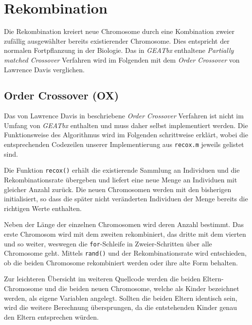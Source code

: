 \section{Rekombination}\label{recombination}

Die Rekombination kreiert neue Chromosome durch eine Kombination zweier zufällig
ausgewählter bereits existierender Chromosome. Dies entspricht der normalen
Fortpflanzung in der Biologie.
Das in \emph{GEATbx} enthaltene \emph{Partially matched Crossover} Verfahren
wird im Folgenden mit dem \emph{Order Crossover} von Lawrence Davis verglichen.


\subsection{Order Crossover (OX)}
Das von Lawrence Davis in \citep{ox} beschriebene \emph{Order Crossover} Verfahren ist nicht im
Umfang von \emph{GEATbx} enthalten und muss daher selbst implementiert werden.
Die Funktionsweise des Algorithmus wird im Folgenden schrittweise erklärt, wobei
die entsprechenden Codezeilen unserer Implementierung aus {\tt recox.m}
jeweils gelistet sind.

\newcommand{\recox}[2]{}

Die Funktion {\tt recox()} erhält die existierende Sammlung an Individuen und
die Rekombinationsrate übergeben und liefert eine neue Menge an Individuen mit
gleicher Anzahl zurück.
Die neuen Chromosomen werden mit den bisherigen initialisiert, so dass die
später nicht veränderten Individuen der Menge bereits die richtigen Werte
enthalten.

\recox{1}{5}

\noindent Neben der Länge der einzelnen Chromosomen wird deren Anzahl bestimmt.
Das erste Chromosom wird mit dem zweiten rekombiniert, das dritte mit dem vierten
und so weiter, weswegen die {\tt for}-Schleife in Zweier-Schritten über alle
Chromosome geht.
Mittels {\tt rand()} und der Rekombinationsrate wird entschieden, ob die beiden
Chromosome rekombiniert werden oder ihre alte Form behalten.

\recox{7}{13}

\noindent Zur leichteren Übersicht im weiteren Quellcode werden die beiden
Eltern-Chromosome und die beiden neuen Chromosome, welche als Kinder bezeichnet
werden, als eigene Variablen angelegt.
Sollten die beiden Eltern identisch sein, wird die weitere Berechnung
übersprungen, da die entstehenden Kinder genau den Eltern entsprechen würden.

